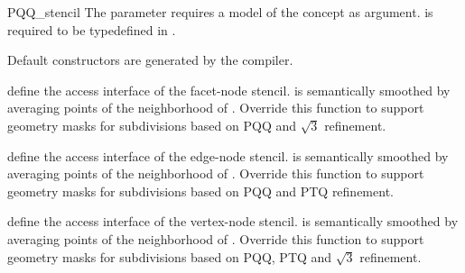 \begin{ccRefClass}{PQQ_stencil}
The  parameter requires a model of 
the  concept as argument.  
is required to be typedefined in .








\ccCreation

Default constructors are generated by the compiler.


\ccThree{}{}{}

{define the access interface of the facet-node stencil. 
 is semantically smoothed by averaging points of the
neighborhood of .
Override this function to support geometry masks for subdivisions 
based on PQQ and $\sqrt{3}$ refinement.} 

{define the access interface of the edge-node stencil. 
 is semantically smoothed by averaging points of 
the neighborhood of .
Override this function to support geometry masks for subdivisions 
based on PQQ and PTQ refinement.} 

{define the access interface of the vertex-node stencil.
 is semantically smoothed by averaging points of 
the neighborhood of .
Override this function to support geometry masks for subdivisions 
based on PQQ, PTQ and $\sqrt{3}$ refinement.} 





\end{ccRefClass}

